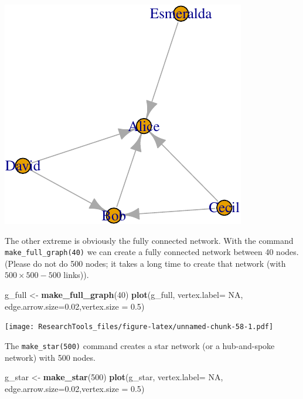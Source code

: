 \documentclass[]{article}
\newenvironment{Shaded}{\begin{snugshade}}{\end{snugshade}}
\newcommand{\KeywordTok}[1]{\textcolor[rgb]{0.13,0.29,0.53}{\textbf{#1}}}
\newcommand{\DataTypeTok}[1]{\textcolor[rgb]{0.13,0.29,0.53}{#1}}
\newcommand{\DecValTok}[1]{\textcolor[rgb]{0.00,0.00,0.81}{#1}}
\newcommand{\FloatTok}[1]{\textcolor[rgb]{0.00,0.00,0.81}{#1}}
\newcommand{\StringTok}[1]{\textcolor[rgb]{0.31,0.60,0.02}{#1}}
\newcommand{\OtherTok}[1]{\textcolor[rgb]{0.56,0.35,0.01}{#1}}
\newcommand{\NormalTok}[1]{#1}
\theoremstyle{definition}
\theoremstyle{definition}
\theoremstyle{definition}
\theoremstyle{remark}
\begin{document}
\includegraphics{ResearchTools_files/figure-latex/unnamed-chunk-57-1.pdf}

The other extreme is obviously the fully connected network. With the
command \texttt{make\_full\_graph(40)} we can create a fully connected
network between 40 nodes. (Please do not do 500 nodes; it takes a long
time to create that network (with \(500 \times 500 - 500\) links)).

\begin{Shaded}
\begin{Highlighting}[]
\NormalTok{g_full <-}\StringTok{ }\KeywordTok{make_full_graph}\NormalTok{(}\DecValTok{40}\NormalTok{)}
\KeywordTok{plot}\NormalTok{(g_full, }\DataTypeTok{vertex.label=} \OtherTok{NA}\NormalTok{, }\DataTypeTok{edge.arrow.size=}\FloatTok{0.02}\NormalTok{,}\DataTypeTok{vertex.size =} \FloatTok{0.5}\NormalTok{)}
\end{Highlighting}
\end{Shaded}

\texttt{[image: ResearchTools\_files/figure-latex/unnamed-chunk-58-1.pdf]}

The \texttt{make\_star(500)} command creates a star network (or a
hub-and-spoke network) with 500 nodes.

\begin{Shaded}
\begin{Highlighting}[]
\NormalTok{g_star <-}\StringTok{ }\KeywordTok{make_star}\NormalTok{(}\DecValTok{500}\NormalTok{)}
\KeywordTok{plot}\NormalTok{(g_star, }\DataTypeTok{vertex.label=} \OtherTok{NA}\NormalTok{, }\DataTypeTok{edge.arrow.size=}\FloatTok{0.02}\NormalTok{,}\DataTypeTok{vertex.size =} \FloatTok{0.5}\NormalTok{)}
\end{Highlighting}
\end{Shaded}
\end{document}

